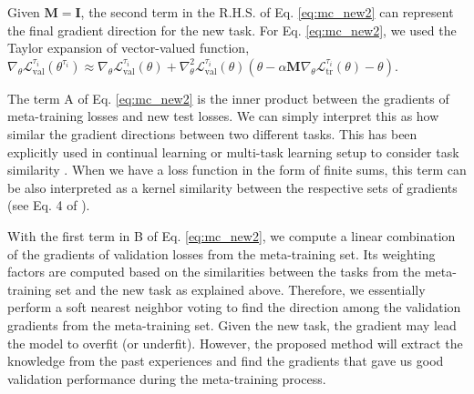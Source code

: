 \documentclass{article}
\newcommand*{\B}[1]{\mathbf{#1}}
\newcommand*{\C}[1]{\mathcal{#1}}
\newcommand*{\T}[1]{\textrm{#1}}
\begin{document}
Given $\B{M}=\B{I}$, the second term in the R.H.S. of Eq. \ref{eq:mc_new2} can represent the final gradient direction for the new task. For Eq. \ref{eq:mc_new2}, we used the Taylor expansion of vector-valued function, $\nabla_\theta \C{L}_\T{val}^{\tau_i} (\theta^{\tau_i}) \approx \nabla_\theta \C{L}_\T{val}^{\tau_i} (\theta) +  \nabla_\theta^2 \C{L}_\T{val}^{\tau_i}(\theta) (\theta - \alpha \B{M} \nabla_\theta \C{L}_\T{tr}^{\tau_i}(\theta) - \theta)$.

The term A of Eq. \ref{eq:mc_new2} is the inner product between the gradients of meta-training losses and new test losses. We can simply interpret this as how similar the gradient directions between two different tasks. This has been explicitly used in continual learning or multi-task learning setup to consider task similarity \cite{Du-arxiv-2018,Lopez-nips2017,Riemer-iclr19}. When we have a loss function in the form of finite sums, this term can be also interpreted as a kernel similarity between the respective sets of gradients (see Eq. 4 of \cite{Muandet-nips2012}).

With the first term in B of Eq. \ref{eq:mc_new2}, we compute a linear combination of the gradients of validation losses from the meta-training set. Its weighting factors are computed based on the similarities between the tasks from the meta-training set and the new task as explained above. Therefore, we essentially perform a soft nearest neighbor voting to find the direction among the validation gradients from the meta-training set. Given the new task, the gradient may lead the model to overfit (or underfit). However, the proposed method will extract the knowledge from the past experiences and find the gradients that gave us good validation performance during the meta-training process.
\end{document}
